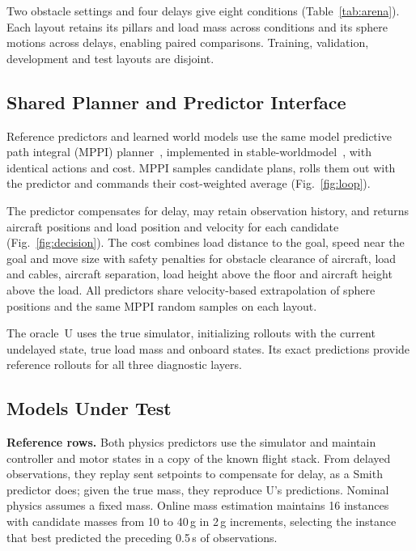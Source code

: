 \documentclass[conference]{IEEEtran}
\begin{document}
Two obstacle settings and four delays give eight conditions (Table~\ref{tab:arena}). Each layout retains its pillars and load mass across conditions and its sphere motions across delays, enabling paired comparisons. Training, validation, development and test layouts are disjoint.

\subsection{Shared Planner and Predictor Interface}\label{sec:planner}
Reference predictors and learned world models use the same model predictive path integral (MPPI) planner~\cite{williams2017mppi}, implemented in stable-worldmodel~\cite{maes2026stableworldmodel}, with identical actions and cost. MPPI samples candidate plans, rolls them out with the predictor and commands their cost-weighted average (Fig.~\ref{fig:loop}).

The predictor compensates for delay, may retain observation history, and returns aircraft positions and load position and velocity for each candidate (Fig.~\ref{fig:decision}). The cost combines load distance to the goal, speed near the goal and move size with safety penalties for obstacle clearance of aircraft, load and cables, aircraft separation, load height above the floor and aircraft height above the load. All predictors share velocity-based extrapolation of sphere positions and the same MPPI random samples on each layout.

The oracle~U uses the true simulator, initializing rollouts with the current undelayed state, true load mass and onboard states. Its exact predictions provide reference rollouts for all three diagnostic layers.

\subsection{Models Under Test}\label{sec:rows}
\textbf{Reference rows.} Both physics predictors use the simulator and maintain controller and motor states in a copy of the known flight stack. From delayed observations, they replay sent setpoints to compensate for delay, as a Smith predictor does; given the true mass, they reproduce U's predictions. Nominal physics assumes a fixed mass. Online mass estimation maintains 16 instances with candidate masses from 10 to 40\,g in 2\,g increments, selecting the instance that best predicted the preceding 0.5\,s of observations.
\end{document}
